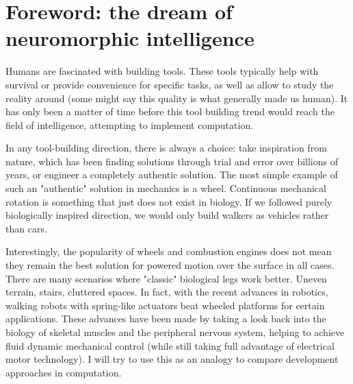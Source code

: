 
\section*{Foreword: the dream of neuromorphic intelligence}

Humans are fascinated with building tools. These tools typically help with survival or provide convenience for specific tasks, as well as allow to study the reality around (some might say this quality is what generally made us human). It has only been a matter of time before this tool building trend would reach the field of intelligence, attempting to implement computation.

In any tool-building direction, there is always a choice: take inspiration from nature, which has been finding solutions through trial and error over billions of years, or engineer a completely authentic solution. The most simple example of such an "authentic" solution in mechanics is a wheel. Continuous mechanical rotation is something that just does not exist in biology. If we followed purely biologically inspired direction, we would only build walkers as vehicles rather than cars.

Interestingly, the popularity of wheels and combustion engines does not mean they remain the best solution for powered motion over the surface in all cases. There are many scenarios where "classic" biological legs work better. Uneven terrain, stairs, cluttered spaces. In fact, with the recent advances in robotics, walking robots with spring-like actuators beat wheeled platforms for certain applications. These advances have been made by taking a look back into the biology of skeletal muscles and the peripheral nervous system, helping to achieve fluid dynamic mechanical control (while still taking full advantage of electrical motor technology). I will try to use this as an analogy to compare development approaches in computation.\\

